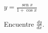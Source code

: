 \item $\displaystyle y = \frac{\operatorname{sen} x}{1 + \cos x}$
\par
Encuentre $\displaystyle \frac{dy}{dx}$.
